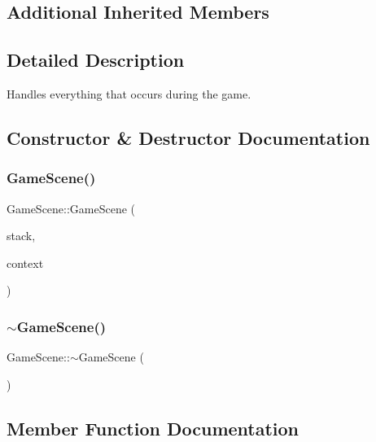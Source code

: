 \subsection*{Additional Inherited Members}


\subsection{Detailed Description}
Handles everything that occurs during the game. 



\subsection{Constructor \& Destructor Documentation}
\mbox{\label{class_game_scene_a09ae1eacea6ea92074d008c016e0ed1f}} 
\subsubsection{\texorpdfstring{Game\+Scene()}{GameScene()}}
{\footnotesize\ttfamily Game\+Scene\+::\+Game\+Scene (\begin{DoxyParamCaption}\item[{\hyperlink{class_scene_stack}{Scene\+Stack} \&}]{stack,  }\item[{\hyperlink{struct_scene_1_1_context}{Context}}]{context }\end{DoxyParamCaption})}

\mbox{\label{class_game_scene_add5bc48c372aaa7f526c02558a8adf00}} 
\subsubsection{\texorpdfstring{$\sim$\+Game\+Scene()}{~GameScene()}}
{\footnotesize\ttfamily Game\+Scene\+::$\sim$\+Game\+Scene (\begin{DoxyParamCaption}{ }\end{DoxyParamCaption})}



\subsection{Member Function Documentation}
\mbox{\label{class_game_scene_a6cef526c611ff96b8771e60eea8ccebe}} 
